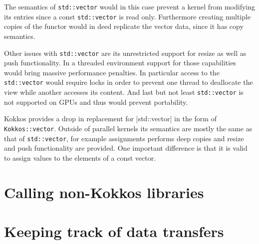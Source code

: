 The semantics of \lstinline|std::vector| would in this case prevent a kernel from modifying its 
entries since a const \lstinline|std::vector| is read only. Furthermore creating multiple copies
of the functor would in deed replicate the vector data, since it has copy semantics.

Other issues with \lstinline|std::vector| are its unrestricted support for resize as well as push 
functionality. In a threaded environment support for those capabilities would bring
massive performance penalties. In particular access to the \lstinline|std::vector| would require
locks in order to prevent one thread to deallocate the view while another accesses its content.
And last but not least \lstinline|std::vector| is not supported on GPUs and thus would prevent
portability. 
 
Kokkos provides a drop in replacement for |std::vector| in the form of \lstinline|Kokkos::vector|.
Outside of parallel kernels its semantics are mostly the same as that of \lstinline|std::vector|, for
example assignments performs deep copies and resize and push functionality are provided.
One important difference is that it is valid to assign values to the elements of a const vector.

\section{Calling non-Kokkos libraries}

\section{Keeping track of data transfers}

 
